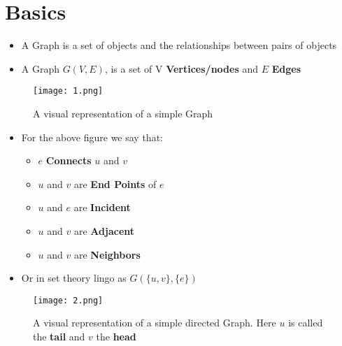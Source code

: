 \chapter{Basics}
\begin{itemize}
\item A Graph is a set of objects and the relationships between pairs of objects
\item A Graph $G(V,E)$, is a set of V \textbf{Vertices/nodes} and $E$ \textbf{Edges}
\end{itemize}
\begin{figure}[h]
	\centering
\texttt{[image: 1.png]}
\caption{A visual representation of a simple Graph}
\end{figure}
\begin{itemize}
\item For the above figure we say that:
\begin{itemize}
\item $e$ \textbf{Connects} $u$ and $v$
\item $u$ and $v$ are \textbf{End Points} of $e$
\item $u$ and $e$ are \textbf{Incident}
\item $u$ and $v$ are \textbf{Adjacent}
\item $u$ and $v$ are \textbf{Neighbors}
\end{itemize}
\item Or in set theory lingo as $G(\{u,v\},\{e\})$
\end{itemize}
\begin{figure}[h]\label{fig_2}
	\centering
	\texttt{[image: 2.png]}
	\caption{A visual representation of a simple directed Graph. Here $u$ is called the \textbf{tail} and $v$ the \textbf{head}}
\end{figure}
